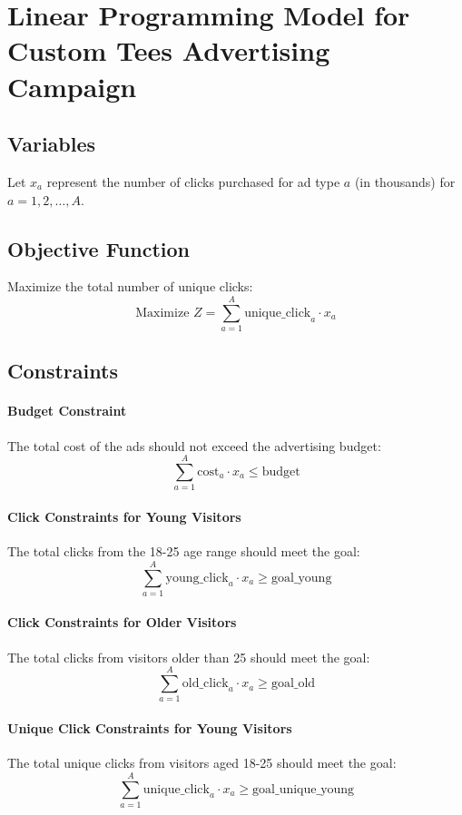 \documentclass{article}
\begin{document}
\section*{Linear Programming Model for Custom Tees Advertising Campaign}

\subsection*{Variables}
Let \( x_a \) represent the number of clicks purchased for ad type \( a \) (in thousands) for \( a = 1, 2, \ldots, A \).

\subsection*{Objective Function}
Maximize the total number of unique clicks:
\[
\text{Maximize } Z = \sum_{a=1}^{A} \text{unique\_click}_{a} \cdot x_a
\]

\subsection*{Constraints}

\paragraph{Budget Constraint}
The total cost of the ads should not exceed the advertising budget:
\[
\sum_{a=1}^{A} \text{cost}_{a} \cdot x_a \leq \text{budget}
\]

\paragraph{Click Constraints for Young Visitors}
The total clicks from the 18-25 age range should meet the goal:
\[
\sum_{a=1}^{A} \text{young\_click}_{a} \cdot x_a \geq \text{goal\_young}
\]

\paragraph{Click Constraints for Older Visitors}
The total clicks from visitors older than 25 should meet the goal:
\[
\sum_{a=1}^{A} \text{old\_click}_{a} \cdot x_a \geq \text{goal\_old}
\]

\paragraph{Unique Click Constraints for Young Visitors}
The total unique clicks from visitors aged 18-25 should meet the goal:
\[
\sum_{a=1}^{A} \text{unique\_click}_{a} \cdot x_a \geq \text{goal\_unique\_young}
\]
\end{document}
